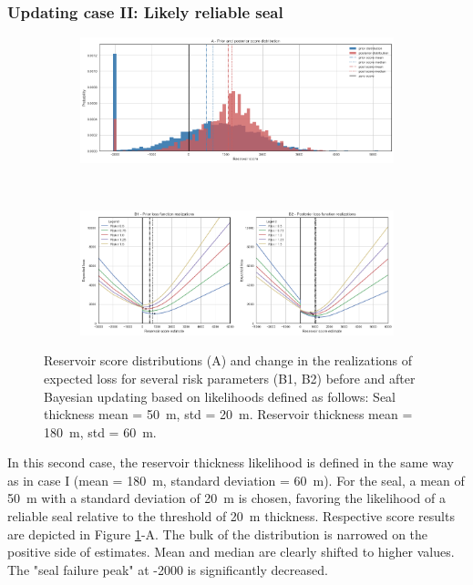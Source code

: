 				\subsubsection{Updating case II: Likely reliable seal}
				\begin{figure}[h]
					\begin{subfigure}{1\textwidth}
						\centering
						\includegraphics[width=1\linewidth]{Figures/update_goodseal2.png}
					\end{subfigure}%
					\\
					\begin{subfigure}{1\textwidth}
						\centering
						\includegraphics[width=1\linewidth]{Figures/update_goodseal3.png}
					\end{subfigure}
					\caption{Reservoir score distributions (A) and change in the realizations of expected loss for several risk parameters (B1, B2) before and after Bayesian updating based on likelihoods defined as follows: Seal thickness mean = 50~m, std = 20~m. Reservoir thickness mean = 180~m, std = 60~m.}
					\label{fig:update_goodseal2_3}
				\end{figure}
				In this second case, the reservoir thickness likelihood is defined in the same way as in case I (mean = 180~m, standard deviation = 60~m). For the seal, a mean of 50~m with a standard deviation of 20~m is chosen, favoring the likelihood of a reliable seal relative to the threshold of 20~m thickness. Respective score results are depicted in Figure \ref{fig:update_goodseal2_3}-A. The bulk of the distribution is narrowed on the positive side of estimates. Mean and median are clearly shifted to higher values. The "seal failure peak" at -2000 is significantly decreased.\\		
